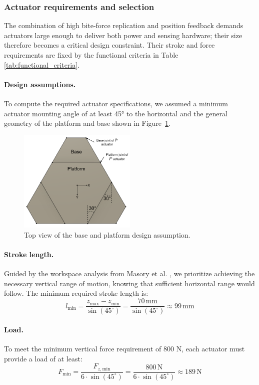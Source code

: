 \subsubsection{Actuator requirements and selection}

The combination of high bite-force replication and position feedback demands actuators large enough to deliver both power and sensing hardware; their size 
therefore becomes a critical design constraint. Their stroke and force requirements are fixed by the functional criteria in Table \ref{tab:functional_criteria}. 

\paragraph{Design assumptions.}To compute the required actuator specifications, we assumed a minimum actuator mounting angle of at least 45° to the horizontal and the general 
geometry of the platform and base shown in Figure~\ref{fig:assumptions}. 
\begin{figure}[H]
\centering
\includegraphics[width=0.5\textwidth]{figures/stewart_platform_assumption.drawio.png}
\caption{Top view of the base and platform design assumption.}
\label{fig:assumptions}
\end{figure}
\paragraph{Stroke length.}Guided by the workspace analysis from Masory et al. \cite{StewartPlatformWorkspace}, we prioritize achieving the necessary vertical range of motion, knowing that sufficient 
horizontal range would follow. The minimum required stroke length is:
\begin{equation}
l_{\text{min}} = \frac{z_{\text{max}} - z_{\text{min}}}{\sin(45^\circ)} = \frac{70\,\text{mm}}{\sin(45^\circ)} \approx 99\,\text{mm}
\end{equation}
\paragraph{Load.} To meet the minimum vertical force requirement of 800 N, each actuator must provide a load of at least:
\begin{equation}
F_{\text{min}} = \frac{F_{z,\text{min}}}{6 \cdot \sin(45^\circ)} = \frac{800\,\text{N}}{6 \cdot \sin(45^\circ)} \approx 189\,\text{N}
\end{equation}

